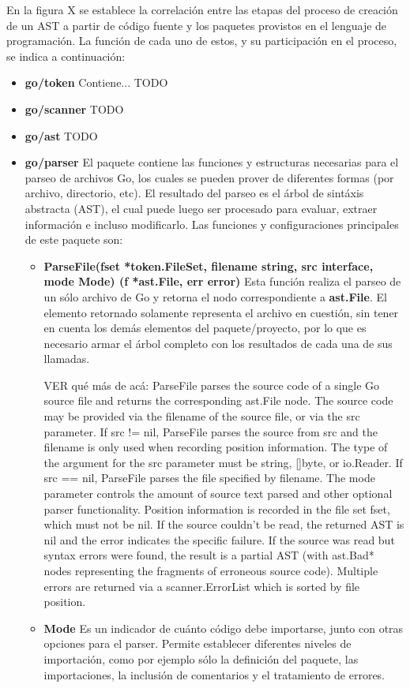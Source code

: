 En la figura X se establece la correlación entre las etapas del proceso de creación de un AST a partir de código fuente y los paquetes provistos en el lenguaje de programación.
La función de cada uno de estos, y su participación en el proceso, se indica a continuación:
\begin{itemize}
  \item \textbf{go/token} Contiene... TODO
  
  \item \textbf{go/scanner} TODO
  
  \item \textbf{go/ast} TODO
  
  \item \textbf{go/parser} El paquete contiene las funciones y estructuras necesarias para el parseo de archivos Go, los cuales se pueden prover de diferentes formas (por archivo, directorio, etc).
  El resultado del parseo es el árbol de sintáxis abstracta (AST), el cual puede luego ser procesado para evaluar, extraer información e incluso modificarlo.
  Las funciones y configuraciones principales de este paquete son:
  \begin{itemize}
    \item \textbf{ParseFile(fset *token.FileSet, filename string, src interface{}, mode Mode) (f *ast.File, err error)} Esta función realiza el parseo de un sólo archivo de Go y retorna el nodo correspondiente a \textbf{ast.File}. El elemento retornado solamente representa el archivo en cuestión, sin tener en cuenta los demás elementos del paquete/proyecto, por lo que es necesario armar el árbol completo con los resultados de cada una de sus llamadas.
    
    VER qué más de acá: ParseFile parses the source code of a single Go source file and returns the corresponding ast.File node. The source code may be provided via the filename of the source file, or via the src parameter. If src != nil, ParseFile parses the source from src and the filename is only used when recording position information. The type of the argument for the src parameter must be string, []byte, or io.Reader. If src == nil, ParseFile parses the file specified by filename. The mode parameter controls the amount of source text parsed and other optional parser functionality. Position information is recorded in the file set fset, which must not be nil. If the source couldn't be read, the returned AST is nil and the error indicates the specific failure. If the source was read but syntax errors were found, the result is a partial AST (with ast.Bad* nodes representing the fragments of erroneous source code). Multiple errors are returned via a scanner.ErrorList which is sorted by file position.

    \item \textbf{Mode} Es un indicador de cuánto código debe importarse, junto con otras opciones para el parser.
    Permite establecer diferentes niveles de importación, como por ejemplo sólo la definición del paquete, las importaciones, la inclusión de comentarios y el tratamiento de errores.
    
  \end{itemize}
  
\end{itemize}
